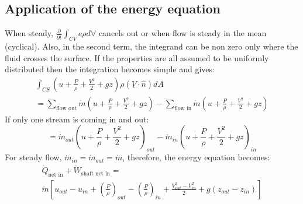 \documentclass[class=report, crop=false, 12pt,a4paper]{standalone}
\begin{document}
\subsection{Application of the energy equation}
When steady, $\frac{\partial}{\partial t} \int_{CV} e \rho d \forall$ cancels out or when flow is steady in the mean (cyclical). Also, in the second term, the integrand can be non zero only where the fluid crosses the surface. If the properties are all assumed to be uniformly distributed then the integration becomes simple and gives:
\begin{gather}
  \int_{CS} (u + \frac{P}{\rho} + \frac{V^2}{2} + gz) \rho (\underline{V} \cdot \hat{n}) dA\\
  = \sum_{\textrm{flow out}} \dot{m} (u + \frac{P}{\rho} + \frac{V^2}{2} + gz) - \sum_{\textrm{flow in}} \dot{m} (u + \frac{P}{\rho} + \frac{V^2}{2} + gz)
\end{gather}
If only one stream is coming in and out:
\begin{equation}
  = \dot{m}_{out} (u + \frac{P}{\rho} + \frac{V^2}{2} + gz)_{out} - \dot{m}_{in} (u + \frac{P}{\rho} + \frac{V^2}{2} + gz)_{in}
\end{equation}
For steady flow, $\dot{m}_{in} = \dot{m}_{out} = \dot{m}$, therefore, the energy equation becomes:
\begin{gather}
  \dot{Q}_{\textrm{net in}} + \dot{W}_{\textrm{shaft net in}} = \\
  \dot{m} \left[ u_{out} - u_{in} + \left( \frac{P}{\rho} \right)_{out} - \left( \frac{P}{\rho} \right)_{in} + \frac{V_{out}^2 - V_{in}^2}{2} + g(z_{out} - z_{in}) \right]
\end{gather}
\end{document}

